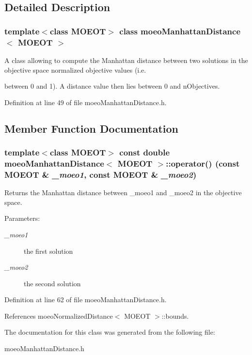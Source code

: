 \subsection{Detailed Description}
\subsubsection*{template$<$class MOEOT$>$ class moeo\-Manhattan\-Distance$<$ MOEOT $>$}

A class allowing to compute the Manhattan distance between two solutions in the objective space normalized objective values (i.e. 

between 0 and 1). A distance value then lies between 0 and n\-Objectives. 



Definition at line 49 of file moeo\-Manhattan\-Distance.h.

\subsection{Member Function Documentation}
\subsubsection{\setlength{\rightskip}{0pt plus 5cm}template$<$class MOEOT$>$ const double \bf{moeo\-Manhattan\-Distance}$<$ MOEOT $>$::operator() (const MOEOT \& {\em \_\-moeo1}, const MOEOT \& {\em \_\-moeo2})\hspace{0.3cm}{\tt  [inline]}}\label{classmoeoManhattanDistance_dcabb2bddb46439a47cd1af5dd124f92}


Returns the Manhattan distance between \_\-moeo1 and \_\-moeo2 in the objective space. 

\begin{Desc}
\item[Parameters:]
\begin{description}
\item[{\em \_\-moeo1}]the first solution \item[{\em \_\-moeo2}]the second solution \end{description}
\end{Desc}


Definition at line 62 of file moeo\-Manhattan\-Distance.h.

References moeo\-Normalized\-Distance$<$ MOEOT $>$::bounds.

The documentation for this class was generated from the following file:\begin{CompactItemize}
\item 
moeo\-Manhattan\-Distance.h\end{CompactItemize}
